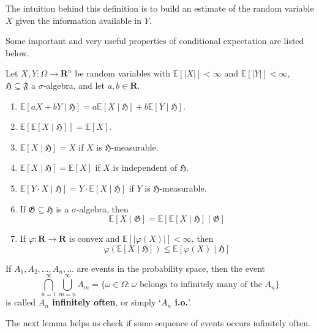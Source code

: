 The intuition behind this definition is to build an estimate of the random variable $X$ given the information available in $Y$.

Some important and very useful properties of conditional expectation are listed below.

\begin{theorem}\label{thm:cond_exp_2}
	Let $X, Y : \Omega \longrightarrow \textbf{R}^n$ be random variables with $\mathbb{E}[|X|] < \infty$ and $\mathbb{E}[|Y|] < \infty$, $\mathfrak{H} \subseteq \mathfrak{F}$ a $\sigma$-algebra, and let $a, b \in \textbf{R}$.
	\begin{enumerate}
		\item $\mathbb{E} [ a X + b Y  \mid  \mathfrak{H}] = a \mathbb{E} [X  \mid  \mathfrak{H}] + b \mathbb{E} [Y  \mid  \mathfrak{H}]$.
		\item $\mathbb{E} [ \mathbb{E} [X  \mid  \mathfrak{H}] ] = \mathbb{E} [X]$.
		\item $\mathbb{E} [X  \mid  \mathfrak{H}] = X$ if $X$ is $\mathfrak{H}$-measurable.
		\item $\mathbb{E} [X  \mid  \mathfrak{H}] = \mathbb{E} [X]$ if $X$ is independent of $\mathfrak{H}$.
		\item $\mathbb{E} [Y \cdot X  \mid  \mathfrak{H}] = Y \cdot \mathbb{E} [X  \mid  \mathfrak{H}]$ if $Y$ is $\mathfrak{H}$-measurable.
		\item If $\mathfrak{G} \subseteq \mathfrak{H}$ is a $\sigma$-algebra, then \[ \mathbb{E} [X  \mid  \mathfrak{G}] = \mathbb{E} [ \mathbb{E} [X  \mid  \mathfrak{H}]  \mid  \mathfrak{G}] \]
		\item If $\varphi : \textbf{R} \longrightarrow \textbf{R}$ is convex and $\mathbb{E} [ | \varphi (X) | ] < \infty$, then \[ \varphi (\mathbb{E} [X  \mid  \mathfrak{H}]) \leq \mathbb{E} [\varphi(X)  \mid  \mathfrak{H}] \]
	\end{enumerate}
\end{theorem}

\begin{definition}
If $A_1, A_2, \ldots, A_n, \ldots$ are events in the probability space, then the event
\[
	\bigcap_{n=1}^\infty \bigcup_{m=n}^\infty A_m = \{ \omega \in \Omega : \omega \text{ belongs to infinitely many of the } A_n \}
\]
is called \textbf{$A_n$ infinitely often}, or simply `\textbf{$A_n$ i.o.}'.
\end{definition}

The next lemma helps us check if some sequence of events occurs infinitely often.

